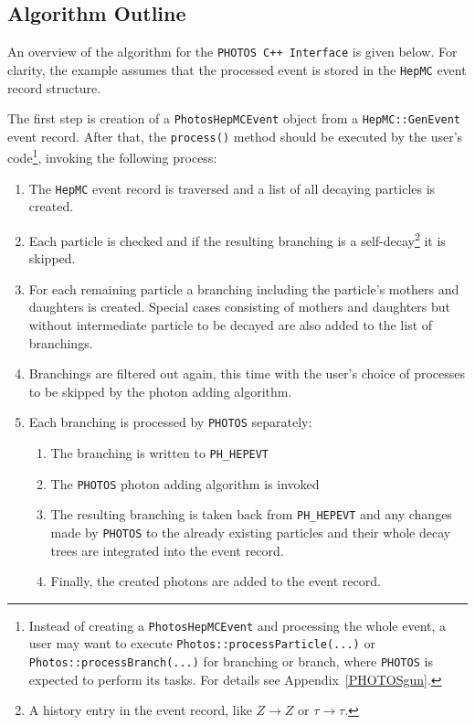 \documentclass[]{Photos_interface_design}
\begin{document}
\subsection{Algorithm Outline}
\label{sect:Outline}

An overview of the algorithm for  the {\tt PHOTOS C++ Interface} is
given below. For clarity, the example assumes that the processed event
is stored in the {\tt HepMC} event record structure.

The first step is creation of a {\tt PhotosHepMCEvent} object from
a {\tt HepMC::GenEvent} event record. After that, the {\tt process()} method should
be executed by the user's code\footnote{Instead of creating a {\tt PhotosHepMCEvent} and processing the whole event,
a user may want to execute {\tt Photos::processParticle(...)} or {\tt Photos::processBranch(...)}
for branching or branch, where {\tt PHOTOS} is expected to perform its tasks.
For details see Appendix~\ref{PHOTOSgun}.
}, invoking the following process:

\begin{enumerate}
\item The {\tt HepMC} event record is traversed and a list of all decaying
      particles is created.
\item Each particle is checked and if the resulting branching is a self-decay\footnote{A history entry in the event record, like
      $Z\to Z$ or $\tau \to \tau$.} it is skipped.
\item For each remaining particle a branching  including the particle's mothers and daughters
      is created. Special cases consisting of mothers and daughters but without  intermediate particle 
to be decayed are also added to the 
	  list of branchings.
\item Branchings are filtered out again, this time with  the user's choice of processes
      to be skipped by the photon adding algorithm.
\item Each branching  is processed by {\tt PHOTOS} separately:

	\begin{enumerate}
  
	\item The branching is written to {\tt PH\_HEPEVT}
	\item The {\tt PHOTOS} photon adding algorithm is invoked 
 	\item The resulting branching is taken back from {\tt PH\_HEPEVT} and any changes made by {\tt PHOTOS}
	      to the already existing particles and their whole decay trees are integrated into the event record.
	\item Finally, the created photons are added to the event record.
	\end{enumerate}

\end{enumerate}
\end{document}
